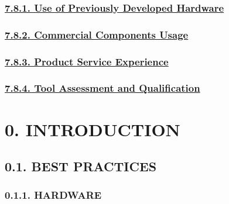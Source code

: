 \documentclass[
]{article}
\begin{document}
\hypertarget{use-of-previously-developed-hardware}{%
\subsubsection{\texorpdfstring{\protect\hyperlink{use-of-previously-developed-hardware-1}{7.8.1.
Use of Previously Developed
Hardware}}{7.8.1. Use of Previously Developed Hardware}}\label{use-of-previously-developed-hardware}}

\hypertarget{commercial-components-usage}{%
\subsubsection{\texorpdfstring{\protect\hyperlink{commercial-components-usage-1}{7.8.2.
Commercial Components
Usage}}{7.8.2. Commercial Components Usage}}\label{commercial-components-usage}}

\hypertarget{product-service-experience}{%
\subsubsection{\texorpdfstring{\protect\hyperlink{product-service-experience-1}{7.8.3.
Product Service
Experience}}{7.8.3. Product Service Experience}}\label{product-service-experience}}

\hypertarget{tool-assessment-and-qualification}{%
\subsubsection{\texorpdfstring{\protect\hyperlink{tool-assessment-and-qualification-1}{7.8.4.
Tool Assessment and
Qualification}}{7.8.4. Tool Assessment and Qualification}}\label{tool-assessment-and-qualification}}

\hypertarget{introduction-1}{%
\section{0. INTRODUCTION}\label{introduction-1}}

\hypertarget{best-practices-1}{%
\subsection{0.1. BEST PRACTICES}\label{best-practices-1}}

\hypertarget{hardware-1}{%
\subsubsection{0.1.1. HARDWARE}\label{hardware-1}}
\end{document}
